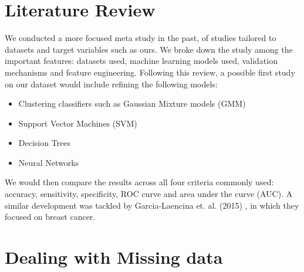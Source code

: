\documentclass[a4paper]{article}
\begin{document}
\section{Literature Review}
We conducted a more focused meta study in the past, of studies tailored to datasets and target variables such as ours. We broke down the study among the important features: datasets used, machine learning models used, validation mechanisms and  feature engineering. 
Following this review, a possible first study on our dataset would include refining the following models:
\begin{itemize}
\item Clustering classifiers such as Gaussian Mixture models (GMM) 
\item Support Vector Machines (SVM)
\item Decision Trees 
\item Neural Networks
\end{itemize}
We would then compare the results across all four criteria commonly used: accuracy, sensitivity, specificity, ROC curve and area under the curve (AUC). A similar development was tackled by Garcia-Laencina et. al. (2015) \cite{Garcia-Laencina2015}, in which they focused on breast cancer. 
\section{Dealing with Missing data}
\end{document}
